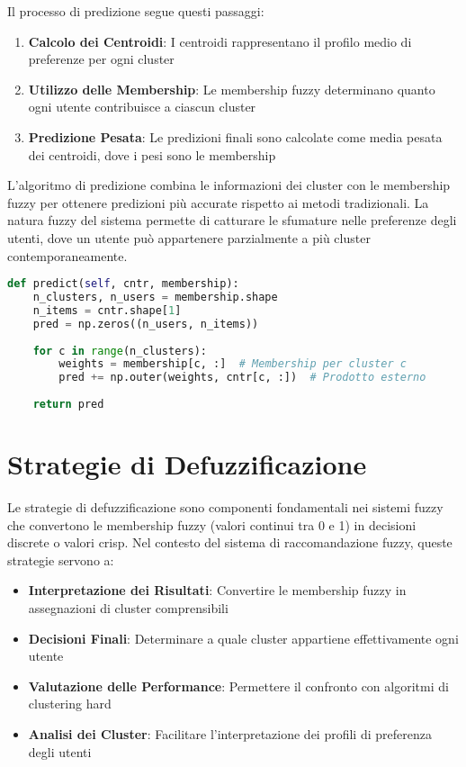 Il processo di predizione segue questi passaggi:

\begin{enumerate}
    \item \textbf{Calcolo dei Centroidi}: I centroidi rappresentano il profilo medio di preferenze per ogni cluster
    \item \textbf{Utilizzo delle Membership}: Le membership fuzzy determinano quanto ogni utente contribuisce a ciascun cluster
    \item \textbf{Predizione Pesata}: Le predizioni finali sono calcolate come media pesata dei centroidi, dove i pesi sono le membership
\end{enumerate}

L'algoritmo di predizione combina le informazioni dei cluster con le membership fuzzy per ottenere predizioni più accurate rispetto ai metodi tradizionali. La natura fuzzy del sistema permette di catturare le sfumature nelle preferenze degli utenti, dove un utente può appartenere parzialmente a più cluster contemporaneamente.

\begin{lstlisting}[language=Python, caption=Algoritmo di predizione]
def predict(self, cntr, membership):
    n_clusters, n_users = membership.shape
    n_items = cntr.shape[1]
    pred = np.zeros((n_users, n_items))
    
    for c in range(n_clusters):
        weights = membership[c, :]  # Membership per cluster c
        pred += np.outer(weights, cntr[c, :])  # Prodotto esterno
    
    return pred
\end{lstlisting}

\section{Strategie di Defuzzificazione}

Le strategie di defuzzificazione sono componenti fondamentali nei sistemi fuzzy che convertono le membership fuzzy (valori continui tra 0 e 1) in decisioni discrete o valori crisp. Nel contesto del sistema di raccomandazione fuzzy, queste strategie servono a:

\begin{itemize}
    \item \textbf{Interpretazione dei Risultati}: Convertire le membership fuzzy in assegnazioni di cluster comprensibili
    \item \textbf{Decisioni Finali}: Determinare a quale cluster appartiene effettivamente ogni utente
    \item \textbf{Valutazione delle Performance}: Permettere il confronto con algoritmi di clustering hard
    \item \textbf{Analisi dei Cluster}: Facilitare l'interpretazione dei profili di preferenza degli utenti
\end{itemize}

